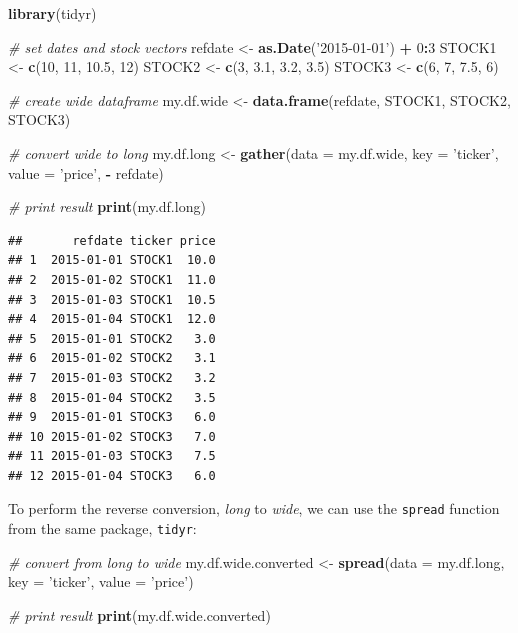 \documentclass[11pt,]{book}
\newenvironment{Shaded}{\begin{snugshade}}{\end{snugshade}}
\newcommand{\KeywordTok}[1]{\textcolor[rgb]{0.27,0.27,0.27}{\textbf{#1}}}
\newcommand{\DataTypeTok}[1]{\textcolor[rgb]{0.27,0.27,0.27}{#1}}
\newcommand{\DecValTok}[1]{\textcolor[rgb]{0.06,0.06,0.06}{#1}}
\newcommand{\FloatTok}[1]{\textcolor[rgb]{0.06,0.06,0.06}{#1}}
\newcommand{\StringTok}[1]{\textcolor[rgb]{0.5,0.5,0.5}{#1}}
\newcommand{\CommentTok}[1]{\textcolor[rgb]{0.56,0.35,0.01}{\textit{#1}}}
\newcommand{\OperatorTok}[1]{\textcolor[rgb]{0.81,0.36,0.00}{\textbf{#1}}}
\newcommand{\NormalTok}[1]{#1}
\begin{document}
\begin{Shaded}
\begin{Highlighting}[]
\KeywordTok{library}\NormalTok{(tidyr)}

\CommentTok{# set dates and stock vectors}
\NormalTok{refdate <-}\StringTok{ }\KeywordTok{as.Date}\NormalTok{(}\StringTok{'2015-01-01'}\NormalTok{) }\OperatorTok{+}\StringTok{ }\DecValTok{0}\OperatorTok{:}\DecValTok{3}
\NormalTok{STOCK1 <-}\StringTok{ }\KeywordTok{c}\NormalTok{(}\DecValTok{10}\NormalTok{, }\DecValTok{11}\NormalTok{, }\FloatTok{10.5}\NormalTok{, }\DecValTok{12}\NormalTok{)}
\NormalTok{STOCK2 <-}\StringTok{ }\KeywordTok{c}\NormalTok{(}\DecValTok{3}\NormalTok{, }\FloatTok{3.1}\NormalTok{, }\FloatTok{3.2}\NormalTok{, }\FloatTok{3.5}\NormalTok{)}
\NormalTok{STOCK3 <-}\StringTok{ }\KeywordTok{c}\NormalTok{(}\DecValTok{6}\NormalTok{, }\DecValTok{7}\NormalTok{, }\FloatTok{7.5}\NormalTok{, }\DecValTok{6}\NormalTok{)}

\CommentTok{# create wide dataframe}
\NormalTok{my.df.wide <-}\StringTok{ }\KeywordTok{data.frame}\NormalTok{(refdate, STOCK1, STOCK2, STOCK3)}

\CommentTok{# convert wide to long}
\NormalTok{my.df.long <-}\StringTok{ }\KeywordTok{gather}\NormalTok{(}\DataTypeTok{data =}\NormalTok{ my.df.wide,}
                     \DataTypeTok{key =} \StringTok{'ticker'}\NormalTok{,}
                     \DataTypeTok{value =} \StringTok{'price'}\NormalTok{,}
                     \OperatorTok{-}\StringTok{ }\NormalTok{refdate)}

\CommentTok{# print result}
\KeywordTok{print}\NormalTok{(my.df.long)}
\end{Highlighting}
\end{Shaded}

\begin{verbatim}
##       refdate ticker price
## 1  2015-01-01 STOCK1  10.0
## 2  2015-01-02 STOCK1  11.0
## 3  2015-01-03 STOCK1  10.5
## 4  2015-01-04 STOCK1  12.0
## 5  2015-01-01 STOCK2   3.0
## 6  2015-01-02 STOCK2   3.1
## 7  2015-01-03 STOCK2   3.2
## 8  2015-01-04 STOCK2   3.5
## 9  2015-01-01 STOCK3   6.0
## 10 2015-01-02 STOCK3   7.0
## 11 2015-01-03 STOCK3   7.5
## 12 2015-01-04 STOCK3   6.0
\end{verbatim}

To perform the reverse conversion, \emph{long} to \emph{wide}, we can
use the \texttt{spread} function from the same package, \texttt{tidyr}:

\begin{Shaded}
\begin{Highlighting}[]
\CommentTok{# convert from long to wide}
\NormalTok{my.df.wide.converted <-}\StringTok{ }\KeywordTok{spread}\NormalTok{(}\DataTypeTok{data =}\NormalTok{ my.df.long, }
                               \DataTypeTok{key =} \StringTok{'ticker'}\NormalTok{,}
                               \DataTypeTok{value =} \StringTok{'price'}\NormalTok{)}

\CommentTok{# print result}
\KeywordTok{print}\NormalTok{(my.df.wide.converted)}
\end{Highlighting}
\end{Shaded}
\end{document}

